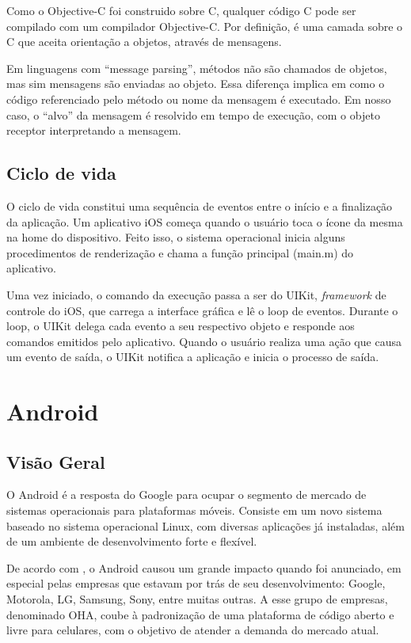  Como o Objective-C foi construido sobre C, qualquer código C pode ser compilado com um compilador Objective-C. Por definição, é uma camada sobre o C que aceita orientação a objetos, através de mensagens.
 
 Em linguagens com ``message parsing'', métodos não são chamados de objetos, mas sim mensagens são enviadas ao objeto. Essa diferença implica em como o código referenciado pelo método ou nome da mensagem é executado. Em nosso caso, o ``alvo'' da mensagem é resolvido em tempo de execução, com o objeto receptor interpretando a mensagem.

 \subsection{Ciclo de vida}
 O ciclo de vida constitui uma sequência de eventos entre o início e a finalização da aplicação. Um aplicativo iOS começa quando o usuário toca o ícone da mesma na home do dispositivo. Feito isso, o sistema operacional inicia alguns procedimentos de renderização e chama a função principal (main.m) do aplicativo.
 
 Uma vez iniciado, o comando da execução passa a ser do UIKit, \emph{framework} de controle do iOS, que carrega a interface gráfica e lê o loop de eventos. Durante o loop, o UIKit delega cada evento a seu respectivo objeto e responde aos comandos emitidos pelo aplicativo. Quando o usuário realiza uma ação que causa um evento de saída, o UIKit notifica a aplicação e inicia o processo de saída.


 \section{Android}

 \subsection{Visão Geral}
 	O Android é a resposta do Google para ocupar o segmento de mercado de sistemas operacionais para plataformas móveis. Consiste em um novo sistema baseado no sistema operacional Linux, com diversas aplicações já instaladas, além de um ambiente de desenvolvimento forte e flexível. 
	
 	De acordo com \cite{lecheta}, o Android causou um grande impacto quando foi anunciado, em especial pelas empresas que estavam por trás de seu desenvolvimento: Google, Motorola, LG, Samsung, Sony, entre muitas outras. A esse grupo de empresas, denominado \ac{OHA}, coube à padronização de uma plataforma de código aberto e livre para celulares, com o objetivo de atender a demanda do mercado atual.
	
